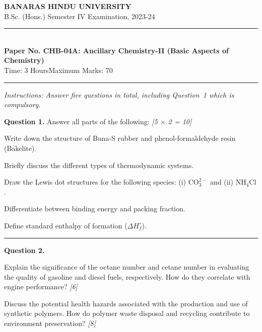 \documentclass[11pt,a4paper]{article}
\newcommand{\pts}[1]{\hfill   \textit{[#1]}}
\begin{document}
\begin{center}
  {\large\bfseries BANARAS HINDU UNIVERSITY}\\[2pt]
  {\normalsize B.Sc. (Hons.) Semester IV Examination, 2023-24}\\[6pt]
  \rule{0.8\linewidth}{0.5pt}\\[6pt]
  {\large\bfseries Paper No. CHB-04A: Ancillary Chemistry-II (Basic Aspects of Chemistry)}\\[4pt]
  {\normalsize Time: 3 Hours\hfill Maximum Marks: 70}
\end{center}
\rule{\linewidth}{0.4pt}
\small



\noindent   \textit{Instructions: Answer five questions in total, including Question~1 which is compulsory.}

\normalsize
\bigskip




\noindent   \textbf{Question 1.} Answer all parts of the following: \pts{5 $ \times$ 2 = 10}

\begin{parts}
  \item Write down the structure of Buna-S rubber and phenol-formaldehyde resin (Bakelite).
  \item Briefly discuss the different types of thermodynamic systems.
  \item Draw the Lewis dot structures for the following species: (i) $ \text{CO}_3^{2-}$ and (ii) $ \text{NH}_4 \text{Cl}$.
  \item Differentiate between binding energy and packing fraction.
  \item Define standard enthalpy of formation ($\Delta H_f^\circ$).
\end{parts}

\medskip\rule{\linewidth}{0.2pt}




\noindent   \textbf{Question 2.}

\begin{parts}
  \item Explain the significance of the octane number and cetane number in evaluating the quality of gasoline and diesel fuels, respectively. How do they correlate with engine performance? \pts{6}
  \item Discuss the potential health hazards associated with the production and use of synthetic polymers. How do polymer waste disposal and recycling contribute to environment preservation? \pts{8}
\end{parts}
\end{document}
